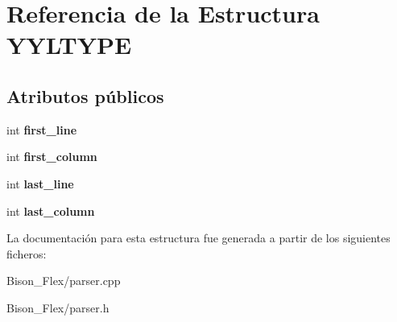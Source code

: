 \hypertarget{struct_y_y_l_t_y_p_e}{\section{Referencia de la Estructura Y\-Y\-L\-T\-Y\-P\-E}
\label{struct_y_y_l_t_y_p_e}
}
\subsection*{Atributos públicos}
\begin{DoxyCompactItemize}
\item 
\hypertarget{struct_y_y_l_t_y_p_e_a50ad3435eaea74bcab6f1ae5fbaefd89}{int {\bfseries first\-\_\-line}}\label{struct_y_y_l_t_y_p_e_a50ad3435eaea74bcab6f1ae5fbaefd89}

\item 
\hypertarget{struct_y_y_l_t_y_p_e_a3a556533babab1b9066fa9bdbb809210}{int {\bfseries first\-\_\-column}}\label{struct_y_y_l_t_y_p_e_a3a556533babab1b9066fa9bdbb809210}

\item 
\hypertarget{struct_y_y_l_t_y_p_e_a3075f2bc3448df5d2a9f16d22bff2cc1}{int {\bfseries last\-\_\-line}}\label{struct_y_y_l_t_y_p_e_a3075f2bc3448df5d2a9f16d22bff2cc1}

\item 
\hypertarget{struct_y_y_l_t_y_p_e_acf87f8c98686f286eaf700c4b62157b2}{int {\bfseries last\-\_\-column}}\label{struct_y_y_l_t_y_p_e_acf87f8c98686f286eaf700c4b62157b2}

\end{DoxyCompactItemize}


La documentación para esta estructura fue generada a partir de los siguientes ficheros\-:\begin{DoxyCompactItemize}
\item 
Bison\-\_\-\-Flex/parser.\-cpp\item 
Bison\-\_\-\-Flex/parser.\-h\end{DoxyCompactItemize}

